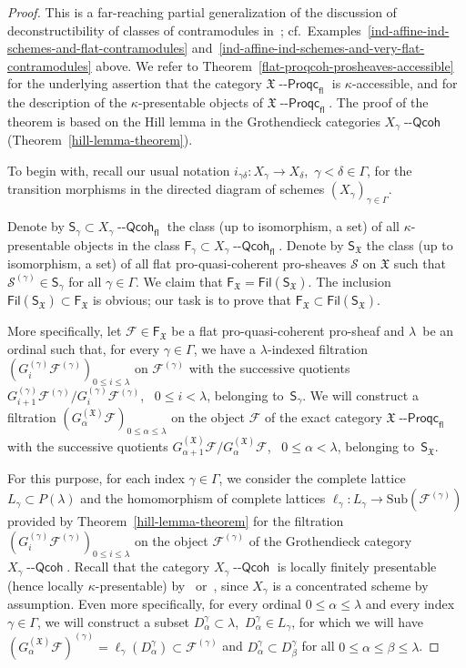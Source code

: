 \documentclass[12pt,a4paper]{amsart}
\newcommand{\+}{\protect\nobreakdash-}
\renewcommand{\:}{\colon}
\newcommand{\rarrow}{\longrightarrow}
\newcommand{\Qcoh}{{\operatorname{\mathsf{--Qcoh}}}}
\newcommand{\Proqc}{{\operatorname{\mathsf{--Proqc}}}}
\newcommand{\fl}{\mathsf{fl}}
\newcommand{\Fil}{\mathsf{Fil}}
\newcommand{\Sub}{\mathrm{Sub}}
\newcommand{\sF}{\mathsf F}
\newcommand{\sS}{\mathsf S}
\newcommand{\fX}{\mathfrak X}
\newcommand{\rF}{\mathscr F}
\newcommand{\rS}{\mathscr S}
\theoremstyle{plain}
\theoremstyle{definition}
\begin{document}
\begin{proof}
 This is a far-reaching partial generalization of the discussion of
deconstructibility of classes of contramodules
in~\cite[Corollary~7.6 and Examples~7.12(2\+-3)]{PR}; cf.\
Examples~\ref{ind-affine-ind-schemes-and-flat-contramodules}
and~\ref{ind-affine-ind-schemes-and-very-flat-contramodules} above.
 We refer to Theorem~\ref{flat-proqcoh-prosheaves-accessible} for
the underlying assertion that the category $\fX\Proqc_\fl$ is
$\kappa$\+accessible, and for the description of
the $\kappa$\+presentable objects of $\fX\Proqc_\fl$.
 The proof of the theorem is based on the Hill lemma in
the Grothendieck categories $X_\gamma\Qcoh$
(Theorem~\ref{hill-lemma-theorem}).

 To begin with, recall our usual notation $i_{\gamma\delta}\:X_\gamma
\rarrow X_\delta$, \,$\gamma<\delta\in\Gamma$, for the transition
morphisms in the directed diagram of schemes
$(X_\gamma)_{\gamma\in\Gamma}$.

 Denote by $\sS_\gamma\subset X_\gamma\Qcoh_\fl$ the class (up
to isomorphism, a set) of all $\kappa$\+presentable objects in
the class $\sF_\gamma\subset X_\gamma\Qcoh_\fl$.
 Denote by $\sS_\fX$ the class (up to isomorphism, a set) of all
flat pro-quasi-coherent pro-sheaves $\rS$ on $\fX$ such that
$\rS^{(\gamma)}\in\sS_\gamma$ for all $\gamma\in\Gamma$.
 We claim that $\sF_\fX=\Fil(\sS_\fX)$.
 The inclusion $\Fil(\sS_\fX)\subset\sF_\fX$ is obvious; our task
is to prove that $\sF_\fX\subset\Fil(\sS_\fX)$.

 More specifically, let $\rF\in\sF_\fX$ be a flat pro-quasi-coherent
pro-sheaf and $\lambda$~be an ordinal such that, for every
$\gamma\in\Gamma$, we have a $\lambda$\+indexed filtration
$(G^{(\gamma)}_i\rF^{(\gamma)})_{0\le i\le\lambda}$ on $\rF^{(\gamma)}$
with the successive quotients $G^{(\gamma)}_{i+1}\rF^{(\gamma)}/
G^{(\gamma)}_i\rF^{(\gamma)}$, \ $0\le i<\lambda$, belonging
to~$\sS_\gamma$.
 We will construct a filtration
$(G^{(\fX)}_\alpha\rF)_{0\le \alpha\le\lambda}$
on the object $\rF$ of the exact category $\fX\Proqc_\fl$ with
the successive quotients $G^{(\fX)}_{\alpha+1}\rF/G^{(\fX)}_\alpha\rF$,
\ $0\le\alpha<\lambda$, belonging to~$\sS_\fX$.

 For this purpose, for each index $\gamma\in\Gamma$, we consider
the complete lattice $L_\gamma\subset P(\lambda)$ and the homomorphism
of complete lattices $\ell_\gamma\:L_\gamma\rarrow\Sub(\rF^{(\gamma)})$
provided by Theorem~\ref{hill-lemma-theorem} for the filtration
$(G^{(\gamma)}_i\rF^{(\gamma)})_{0\le i\le\lambda}$ on the object
$\rF^{(\gamma)}$ of the Grothendieck category $X_\gamma\Qcoh$.
 Recall that the category $X_\gamma\Qcoh$ is locally finitely
presentable (hence locally $\kappa$\+presentable)
by~\cite[0.5.2.5 and Corollaire~I.6.9.12]{EGA1}
or~\cite[Definition Tag~01BN and Lemma Tag~01PJ or~01PK]{SP},
since $X_\gamma$ is a concentrated scheme by assumption.
 Even more specifically, for every ordinal $0\le\alpha\le\lambda$
and every index $\gamma\in\Gamma$, we will construct a subset
$D_\alpha^\gamma\subset\lambda$, \,$D_\alpha^\gamma\in L_\gamma$,
for which we will have $(G^{(\fX)}_\alpha\rF)^{(\gamma)}=
\ell_\gamma(D_\alpha^\gamma)\subset\rF^{(\gamma)}$ and
$D_\alpha^\gamma\subset D_\beta^\gamma$ for all
$0\le\alpha\le\beta\le\lambda$.


\end{proof}
\end{document}
